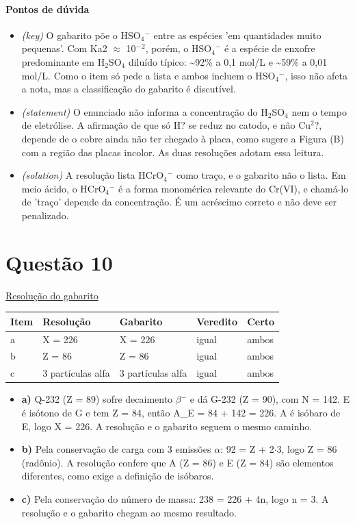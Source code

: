 \documentclass{article}%
\begin{document}
\paragraph{Pontos de dúvida}%
\begin{itemize}%
\item%
\textit{(key)} O gabarito põe o HSO$_{4}$$^{-}$ entre as espécies 'em quantidades muito pequenas'. Com Ka2 $\approx$ 10$^{-}$$^2$, porém, o HSO$_{4}$$^{-}$ é a espécie de enxofre predominante em H$_{2}$SO$_{4}$ diluído típico: \textasciitilde{}92\% a 0,1 mol/L e \textasciitilde{}59\% a 0,01 mol/L. Como o item só pede a lista e ambos incluem o HSO$_{4}$$^{-}$, isso não afeta a nota, mas a classificação do gabarito é discutível.%
\item%
\textit{(statement)} O enunciado não informa a concentração do H$_{2}$SO$_{4}$ nem o tempo de eletrólise. A afirmação de que só H? se reduz no catodo, e não Cu$^2$?, depende de o cobre ainda não ter chegado à placa, como sugere a Figura (B) com a região das placas incolor. As duas resoluções adotam essa leitura.%
\item%
\textit{(solution)} A resolução lista HCrO$_{4}$$^{-}$ como traço, e o gabarito não o lista. Em meio ácido, o HCrO$_{4}$$^{-}$ é a forma monomérica relevante do Cr(VI), e chamá{-}lo de 'traço' depende da concentração. É um acréscimo correto e não deve ser penalizado.%
\end{itemize}%
\section*{Questão 10}%
\href{https://poliedroresolve.sistemapoliedro.com.br/vestibulares/ita/2026/ita-2-fase-dia-2-29-10-2025-2-fase-dia-2/dissertativa-10-quimica-2-fase-dia-2-ita-2026}{Resolução do gabarito}\par\smallskip%
\begin{longtable}{@{}p{} p{} p{} p{} p{}@{}}\toprule Item & Resolução & Gabarito & Veredito & Certo \\ \midrule
a & X = 226 & X = 226 & igual & ambos \\
b & Z = 86 & Z = 86 & igual & ambos \\
c & 3 partículas alfa & 3 partículas alfa & igual & ambos \\
\bottomrule\end{longtable}%
\begin{itemize}%
\item%
\textbf{a)} Q{-}232 (Z = 89) sofre decaimento $\beta$$^{-}$ e dá G{-}232 (Z = 90), com N = 142. E é isótono de G e tem Z = 84, então A\_E = 84 + 142 = 226. A é isóbaro de E, logo X = 226. A resolução e o gabarito seguem o mesmo caminho.%
\item%
\textbf{b)} Pela conservação de carga com 3 emissões $\alpha$: 92 = Z + 2$\cdot$3, logo Z = 86 (radônio). A resolução confere que A (Z = 86) e E (Z = 84) são elementos diferentes, como exige a definição de isóbaros.%
\item%
\textbf{c)} Pela conservação do número de massa: 238 = 226 + 4n, logo n = 3. A resolução e o gabarito chegam ao mesmo resultado.%
\end{itemize}%
\end{document}
